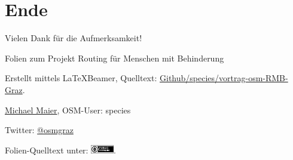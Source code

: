 \documentclass{beamer}
\begin{document}
\section{Ende}

\begin{frame}{Vielen Dank für die Aufmerksamkeit!}

  Folien zum Projekt Routing für Menschen mit Behinderung
\vspace{1cm}

Erstellt mittels \LaTeX Beamer, Quelltext: \href{https://github.com/species/vortrag-osm-RMB-Graz}{Github/species/vortrag-osm-RMB-Graz}.
\vspace{1cm}

\href{mailto:Michael.Maier@student.tugraz.at}{Michael Maier}, OSM-User: species

Twitter: \href{https://twitter.com/osmgraz}{@osmgraz}
\vspace{1cm}

Folien-Quelltext unter: \includegraphics[width=1cm]{cc-zero.pdf}. 

\end{frame}
\end{document}
